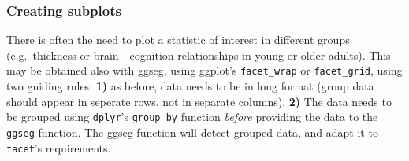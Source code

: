 \documentclass[fleqn,10pt]{wlpeerj} %
\newenvironment{Shaded}{\begin{snugshade}}{\end{snugshade}}
\newcommand{\CommentTok}[1]{\textcolor[rgb]{0.56,0.35,0.01}{\textit{#1}}}
\newcommand{\DataTypeTok}[1]{\textcolor[rgb]{0.13,0.29,0.53}{#1}}
\newcommand{\DecValTok}[1]{\textcolor[rgb]{0.00,0.00,0.81}{#1}}
\newcommand{\KeywordTok}[1]{\textcolor[rgb]{0.13,0.29,0.53}{\textbf{#1}}}
\newcommand{\NormalTok}[1]{#1}
\newcommand{\OperatorTok}[1]{\textcolor[rgb]{0.81,0.36,0.00}{\textbf{#1}}}
\newcommand{\OtherTok}[1]{\textcolor[rgb]{0.56,0.35,0.01}{#1}}
\newcommand{\StringTok}[1]{\textcolor[rgb]{0.31,0.60,0.02}{#1}}
\begin{document}
\hypertarget{creating-subplots}{%
\subsubsection{Creating subplots}\label{creating-subplots}}

There is often the need to plot a statistic of interest in different groups (e.g.~thickness or brain - cognition relationships in young or older adults).
This may be obtained also with ggseg, using ggplot's \texttt{facet\_wrap} or \texttt{facet\_grid}, using two guiding rules:
\textbf{1)} as before, data needs to be in long format (group data should appear in seperate rows, not in separate columns).
\textbf{2)} The data needs to be grouped using \texttt{dplyr}'s \texttt{group\_by} function \emph{before} providing the data to the \texttt{ggseg} function.
The ggseg function will detect grouped data, and adapt it to \texttt{facet}'s requirements.

\begin{Shaded}
\end{Shaded}
\end{document}
